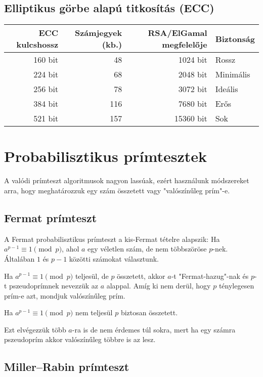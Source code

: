 \subsection*{Elliptikus görbe alapú titkosítás (ECC)}
\begin{center}
\begin{tabular}{rrrl}
\hline 
\textbf{ECC kulcshossz}  & \textbf{Számjegyek (kb.)}  & \textbf{RSA/ElGamal megfelelője}  & \textbf{Biztonság} \tabularnewline
\hline 
160 bit  & 48  & 1024 bit  & Rossz \tabularnewline
224 bit  & 68  & 2048 bit  & Minimális \tabularnewline
256 bit  & 78  & 3072 bit  & Ideális \tabularnewline
384 bit  & 116  & 7680 bit  & Erős \tabularnewline
521 bit  & 157  & 15360 bit  & Sok \tabularnewline
\hline 
\end{tabular}
\par\end{center}

\section*{Probabilisztikus prímtesztek}

A valódi prímteszt algoritmusok nagyon lassúak, ezért használunk módszereket
arra, hogy meghatározzuk egy szám összetett vagy "valószínűleg prím"-e.

\subsection*{Fermat prímteszt}

A Fermat probabilisztikus prímteszt a kis-Fermat tételre alapszik:
Ha $a^{p-1}\equiv1\pmod p$, ahol $a$ egy véletlen szám, de nem többszöröse
$p$-nek. Általában $1$ és $p-1$ közötti számokat választunk.

Ha $a^{p-1}\equiv1\pmod p$ teljesül, de $p$ összetett, akkor $a$-t
"Fermat-hazug"-nak és $p$-t pszeudoprímnek nevezzük az $a$ alappal.
Amíg ki nem derül, hogy $p$ ténylegesen prím-e azt, mondjuk valószínűleg
prím.

Ha $a^{p-1}\equiv1\pmod p$ nem teljesül $p$ biztosan összetett.

Ezt elvégezzük több $a$-ra is de nem érdemes túl sokra, mert ha egy
számra pszeudoprím akkor valószínűleg többre is az lesz.

\subsection*{Miller--Rabin prímteszt}

